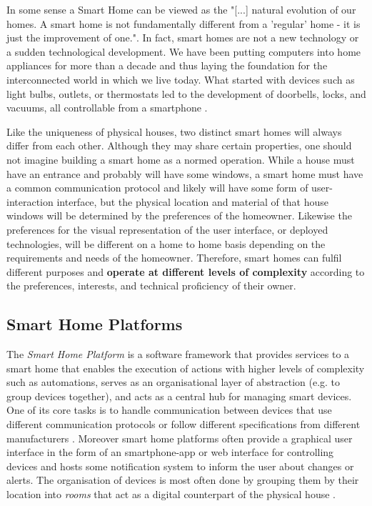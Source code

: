 In some sense a Smart Home can be viewed as the "[...] natural evolution of our homes. A smart home is not fundamentally different from a 'regular' home - it is just the improvement of one."\cite{Tuohy2023SH}. In fact, smart homes are not a new technology or a sudden technological development. We have been putting computers into home appliances for more than a decade \cite{Tuohy2023SH} and thus laying the foundation for the interconnected world in which we live today. What started with devices such as light bulbs, outlets, or thermostats led to the development of doorbells, locks, and vacuums, all controllable from a smartphone \cite{Tuohy2023SH}.

Like the uniqueness of physical houses, two distinct smart homes will always differ from each other. Although they may share certain properties, one should not imagine building a smart home as a normed operation. While a house must have an entrance and probably will have some windows, a smart home must have a common communication protocol and likely will have some form of user-interaction interface, but the physical location and material of that house windows will be determined by the preferences of the homeowner. Likewise the preferences for the visual representation of the user interface, or deployed technologies, will be different on a home to home basis depending on the requirements and needs of the homeowner. Therefore, smart homes can fulfil different purposes and \textbf{ operate at different levels of complexity} according to the preferences, interests, and technical proficiency of their owner.

\subsection{Smart Home Platforms} \label{sec:Smart Home Platforms}
The \textit{Smart Home Platform} is a software framework that provides services to a smart home that enables the execution of actions with higher levels of complexity such as automations, serves as an organisational layer of abstraction (e.g. to group devices together), and acts as a central hub for managing smart devices. One of its core tasks is to handle communication between devices that use different communication protocols or follow different specifications from different manufacturers \cite{Tuohy2023SHP}. Moreover smart home platforms often provide a graphical user interface in the form of an smartphone-app or web interface for controlling devices and hosts some notification system to inform the user about changes or alerts. The organisation of devices is most often done by grouping them by their location into \textit{rooms} that act as a digital counterpart of the physical house \cite{BertkoChris2017HSH:}.

